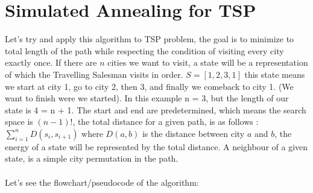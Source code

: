 \documentclass[a4paper]{article}
\begin{document}
\section{Simulated Annealing for TSP}
Let's try and apply this algorithm to TSP problem, the goal is to minimize to total length of the path while respecting the condition of visiting every city exactly once. If there are $n$ cities we want to visit, a state will be a representation of which the Travelling Salesman visits in order. $S = [1,2,3,1]$ this state means we start at city 1, go to city 2, then 3, and finally we comeback to city 1. (We want to finish were we started). In this example n = 3, but the length of our state is 4 = n + 1. The start and end are predetermined, which means the search space is $(n-1)!$, the total distance for a given path, is as follows : $\sum_{i = 1}^{n} D(s_{i}, s_{i+1})$ where $D(a,b)$ is the distance between city $a$ and $b$, the energy of a state will be represented by the total distance. A neighbour of a given state, is a simple city permutation in the path.\\\\
Let's see the flowchart/pseudocode of the algorithm:
\end{document}
